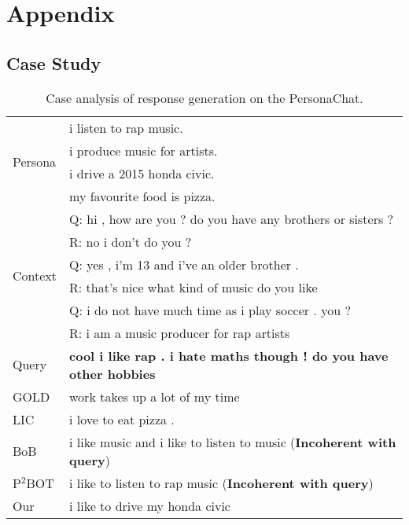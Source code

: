 \documentclass[letterpaper]{article} \usepackage{aaai23}  \usepackage{times}  \usepackage{helvet}  \usepackage{courier}  \usepackage[hyphens]{url}  \usepackage{graphicx} \urlstyle{rm} \def\UrlFont{\rm}  \usepackage{natbib}  \usepackage{caption} \frenchspacing  \setlength{\pdfpagewidth}{8.5in}  \setlength{\pdfpageheight}{11in}  \usepackage{algorithm}
\begin{document}

\appendix
\section{Appendix}
\subsection{Case Study}
\begin{table*}[ht]
  \centering
    \begin{tabular}{ll}
    \toprule
    \multirow{4}{*}{Persona} & i listen to rap music. \\
    ~& i produce music for artists. \\
    ~& i drive a 2015 honda civic. \\
    ~& my favourite food is pizza. \\
    \midrule
    \multirow{6}{*}{Context} & Q: hi , how are you ? do you have any brothers or sisters ? \\
    ~& R: no i don't do you ? \\
    ~& Q: yes , i'm 13 and i've an older brother . \\
    ~& R: that's nice what kind of music do you like \\
    ~& Q: i do not have much time as i play soccer . you ? \\
    ~& R: i am a music producer for rap artists \\
   \bottomrule
\toprule    Query & \textbf{cool i like rap . i hate maths though ! do you have other hobbies} \\
\midrule   GOLD  & work takes up a lot of my time \\
\midrule  LIC   & i love to eat pizza . \\
\midrule   BoB   &  i like music and i like to listen to music (\textbf{Incoherent with query})\\
\midrule    P$^2$BOT & i like to listen to rap music (\textbf{Incoherent with query})\\
\midrule    Our   & i like to drive my honda civic \\
\bottomrule    \end{tabular}\caption{Case analysis of response generation on the PersonaChat.}
\label{table8}\end{table*}
\end{document}
